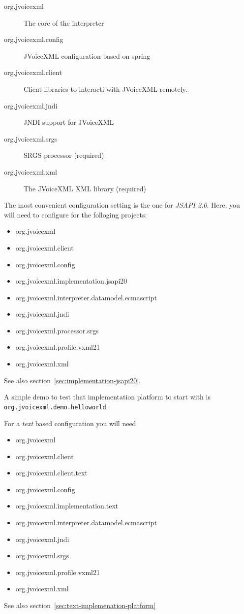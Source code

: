 \documentclass[11pt,a4paper]{article}
\begin{document}
\begin{description}
\item[org.jvoicexml] The core of the interpreter
\item[org.jvoicexml.config] JVoiceXML configuration based on spring
\item[org.jvoicexml.client] Client libraries to interacti with JVoiceXML
remotely.
\item[org.jvoicexml.jndi] JNDI support for JVoiceXML
\item[org.jvoicexml.srgs] SRGS processor (required)
\item[org.jvoicexml.xml] The JVoiceXML XML library (required)
\end{description}

The most convenient configuration setting is the one for \emph{JSAPI 2.0}. Here,
you will need to configure for the folloging projects:
\begin{itemize}
  \item org.jvoicexml
  \item org.jvoicexml.client
  \item org.jvoicexml.config
  \item org.jvoicexml.implementation.jsapi20
  \item org.jvoicexml.interpreter.datamodel.ecmascript
  \item org.jvoicexml.jndi
  \item org.jvoicexml.processor.srgs
  \item org.jvoicexml.profile.vxml21
  \item org.jvoicexml.xml
\end{itemize}
See also section~\ref{sec:implementation-jsapi20}.

A simple demo to test that implementation platform to start with is
\lstinline{org.jvoicexml.demo.helloworld}.

For a \emph{text} based configuration you will need
\begin{itemize}
  \item org.jvoicexml
  \item org.jvoicexml.client
  \item org.jvoicexml.client.text
  \item org.jvoicexml.config
  \item org.jvoicexml.implementation.text
  \item org.jvoicexml.interpreter.datamodel.ecmascript
  \item org.jvoicexml.jndi
  \item org.jvoicexml.srgs
  \item org.jvoicexml.profile.vxml21
  \item org.jvoicexml.xml
\end{itemize}
See also section~\ref{sec:text-implemenation-platform}
\end{document}
